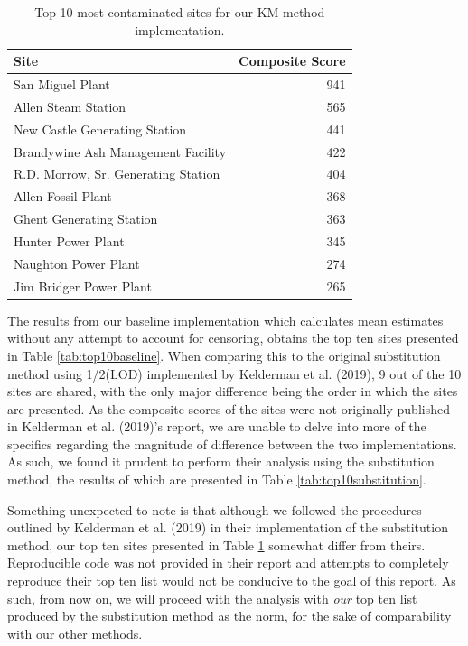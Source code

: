 \documentclass[12pt, twoside]{amherstthesis}
\begin{document}
\begin{table}

\caption{\label{tab:top10km}Top 10 most contaminated sites 
             for our KM method implementation.}
\centering
\fontsize{11.5}{13.5}\selectfont
\begin{tabular}[t]{lr}
\toprule
Site & Composite Score\\
\midrule
San Miguel Plant & 941\\
\addlinespace
Allen Steam Station & 565\\
\addlinespace
New Castle Generating Station & 441\\
\addlinespace
Brandywine Ash Management Facility & 422\\
\addlinespace
R.D. Morrow, Sr. Generating Station & 404\\
\addlinespace
Allen Fossil Plant & 368\\
\addlinespace
Ghent Generating Station & 363\\
\addlinespace
Hunter Power Plant & 345\\
\addlinespace
Naughton Power Plant & 274\\
\addlinespace
Jim Bridger Power Plant & 265\\
\bottomrule
\end{tabular}
\end{table}
The results from our baseline implementation which calculates mean estimates without any attempt to account for censoring, obtains the top ten sites presented in Table \ref{tab:top10baseline}. When comparing this to the original substitution method using 1/2(LOD) implemented by Kelderman et al. (2019), 9 out of the 10 sites are shared, with the only major difference being the order in which the sites are presented. As the composite scores of the sites were not originally published in Kelderman et al. (2019)'s report, we are unable to delve into more of the specifics regarding the magnitude of difference between the two implementations. As such, we found it prudent to perform their analysis using the substitution method, the results of which are presented in Table \ref{tab:top10substitution}.

Something unexpected to note is that although we followed the procedures outlined by Kelderman et al. (2019) in their implementation of the substitution method, our top ten sites presented in Table \ref{tab:top10km} somewhat differ from theirs. Reproducible code was not provided in their report and attempts to completely reproduce their top ten list would not be conducive to the goal of this report. As such, from now on, we will proceed with the analysis with \emph{our} top ten list produced by the substitution method as the norm, for the sake of comparability with our other methods.
\end{document}
